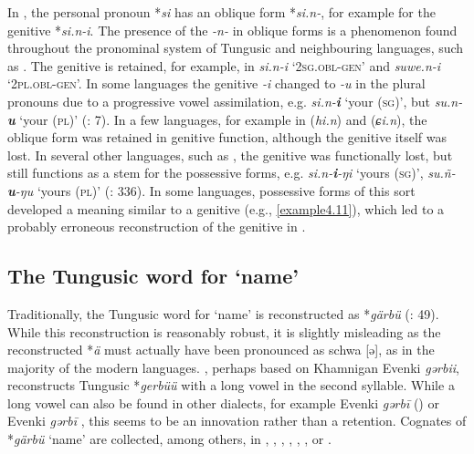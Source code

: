 \documentclass[output=paper,colorlinks,citecolor=brown]{langscibook}
\begin{document}
In , the personal pronoun *\textit{si} has an oblique form *\textit{si.n-}, for example for the genitive *\textit{si.n-i}. The presence of the \textit{-n-} in oblique forms is a phenomenon found throughout the pronominal system of Tungusic and neighbouring languages, such as . The genitive is retained, for example, in  \textit{si.n-i} ‘2\textsc{sg.obl-gen}’ and \textit{suwe.n-i} ‘2\textsc{pl.obl-gen}’. In some languages the genitive \textit{-i} changed to \textit{-u} in the plural pronouns due to a progressive vowel assimilation, e.g.  \textit{si.n-\textbf{i}} ‘your (\textsc{sg})’, but \textit{su.n-\textbf{u}} ‘your (\textsc{pl})’ (\citealt{Tsumagari2009b}: 7). In a few languages, for example in  (\textit{hi.n}) and  (\textit{ɕi.n}), the oblique form was retained in genitive function, although the genitive itself was lost. In several other languages, such as , the genitive was functionally lost, but still functions as a stem for the possessive forms, e.g. \textit{si.n-\textbf{i}-ŋi} ‘yours (\textsc{sg})’, \textit{su.ñ-\textbf{u}-ŋu} ‘yours (\textsc{pl})’ (\citealt{NikolaevaTolskaya2001}: 336). In some languages, possessive forms of this sort developed a meaning similar to a genitive (e.g., \ref{example4.11}), which led to a probably erroneous reconstruction of the genitive in \citet[79]{Benzing1956}.


\subsection{The Tungusic word for ‘name’}\label{section4.4.2}

Traditionally, the Tungusic word for ‘name’ is reconstructed as *\textit{gärbü} (\citealt{Benzing1956}: 49). While this reconstruction is reasonably robust, it is slightly misleading as the reconstructed *\textit{ä} must actually have been pronounced as schwa [ə], as in the majority of the modern languages. \citet[40]{Janhunen1991}, perhaps based on Khamnigan Evenki \textit{gərbii}, reconstructs Tungusic *\textit{gerbüü} with a long vowel in the second syllable. While a long vowel can also be found in other  dialects, for example  Evenki \textit{gərbī} (\citealt{BulatovaCotrozzi2004}) or  Evenki \textit{gərbī} , this seems to be an innovation rather than a retention. Cognates of *\textit{gärbü} ‘name’ are collected, among others, in \citet{Schmidt1923a, Schmidt1923b, Schmidt1928a, Schmidt1928b}, \citet[49]{Benzing1956}, \citet[180f.]{Cincius1975}, \citet[143]{Lie1978}, \citet[68]{Kazama2003}, \citet[336]{Doerferetal2004}, or \citet[300f.]{Chaoke2014eH}.
\end{document}
